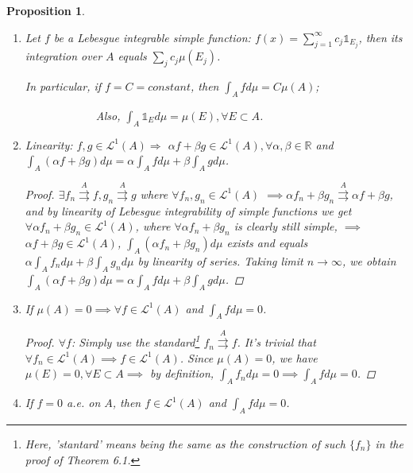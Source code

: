 \documentclass[12pt]{article}
\theoremstyle{blueplain}
\newtheorem{proposition}[theorem]{Proposition}
\theoremstyle{bluedef}
\theoremstyle{blueremark}
\newcommand{\R}{\mathbb{R}}
\numberwithin{equation}{section}
\begin{document}
\begin{proposition}
  \begin{enumerate}
    \item Let $f$ be a Lebesgue integrable simple function: $f(x) = \sum_{j=1}^{\infty} c_j \mathds{1}_{E_j}$, then its integration over $A$ equals $\sum_j c_j \mu(E_j)$.

          In particular, if $f = C = constant$, then $\int_A f d \mu = C \mu(A)$;

          $\qquad \qquad \qquad$ Also, $\int_A \mathds{1}_{E} d\mu = \mu(E), \forall E \subset A$.

    \item Linearity: $f,g \in \mathcal{L}^1(A) \Rightarrow$ $\alpha f + \beta g \in \mathcal{L}^1(A), \forall \alpha, \beta \in \R$ and $\int_A (\alpha f + \beta g) d\mu = \alpha \int_A f d\mu + \beta \int_A g d\mu$.
          \begin{proof}
            $\exists f_n \overset{A}{\rightrightarrows} f, g_n \overset{A}{\rightrightarrows} g$ where $\forall f_n,g_n \in \mathcal{L}^1(A)$ $\implies \alpha f_n + \beta g_n \overset{A}{\rightrightarrows} \alpha f + \beta g$,
            and by linearity of Lebesgue integrability of simple functions we get $\forall \alpha f_n + \beta g_n \in \mathcal{L}^1(A)$, where $\forall \alpha f_n + \beta g_n$ is clearly still simple, $\implies$ $\alpha f + \beta g \in \mathcal{L}^1(A)$, $\int_A (\alpha f_n + \beta g_n) d\mu$ exists and equals $\alpha \int_A f_n d\mu + \beta \int_A g_n d\mu$ by linearity of series. Taking limit $n \to \infty$, we obtain $\int_A (\alpha f + \beta g) d\mu = \alpha \int_A f d\mu + \beta \int_A g d\mu$.
          \end{proof}

    \item If $\mu(A) = 0 \implies \forall f \in \mathcal{L}^1(A)$ and $\int_A f d\mu = 0$.
          \begin{proof}
            $\forall f$: Simply use the standard\footnote[1]{Here, 'stantard' means being the same as the construction of such $\{f_n\}$ in the proof of Theorem 6.1.} $f_n \overset{A}{\rightrightarrows} f $. It's trivial that $\forall f_n \in \mathcal{L}^1(A) \implies f \in \mathcal{L}^1(A)$. Since $\mu(A) = 0$, we have $\mu(E) = 0, \forall E \subset A \implies$ by definition, $\int_A f_n d\mu = 0 \implies \int_A f d\mu = 0$.
          \end{proof}

    \item If $f = 0$ a.e. on $A$, then $f \in \mathcal{L}^1(A)$ and $\int_A f d\mu = 0$.


\end{enumerate}
\end{proposition}
\end{document}
